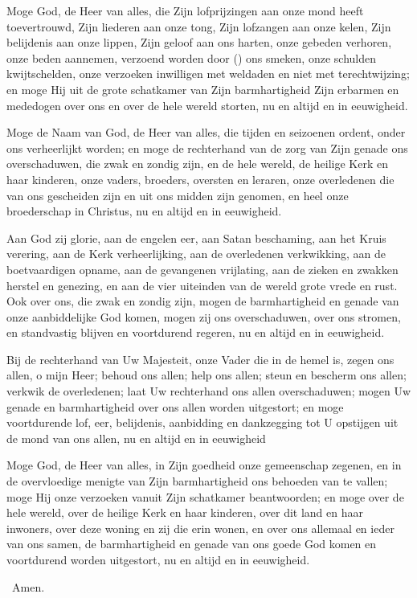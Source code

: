 \documentclass[12pt,twoside,a5paper]{article}
\begin{document}
\begin{halfparskip}
   Moge God, de Heer van alles, die Zijn lofprijzingen aan onze mond heeft toevertrouwd, Zijn liederen aan onze tong, Zijn lofzangen aan onze kelen, Zijn belijdenis aan onze lippen, Zijn geloof aan ons harten, onze gebeden verhoren, onze beden aannemen, verzoend worden door () ons smeken, onze schulden kwijtschelden, onze verzoeken inwilligen met weldaden en niet met terechtwijzing; en moge Hij uit de grote schatkamer van Zijn barmhartigheid Zijn erbarmen en mededogen over ons en over de hele wereld storten, nu en altijd en in eeuwigheid.

   Moge de Naam van God, de Heer van alles, die tijden en seizoenen ordent, onder ons verheerlijkt worden; en moge de rechterhand van de zorg van Zijn genade ons overschaduwen, die zwak en zondig zijn, en de hele wereld, de heilige Kerk en haar kinderen, onze vaders, broeders, oversten en leraren, onze overledenen die van ons gescheiden zijn en uit ons midden zijn genomen, en heel onze broederschap in Christus, nu en altijd en in eeuwigheid.

   Aan God zij glorie, aan de engelen eer, aan Satan beschaming, aan het Kruis verering, aan de Kerk verheerlijking, aan de overledenen verkwikking, aan de boetvaardigen opname, aan de gevangenen vrijlating, aan de zieken en zwakken herstel en genezing, en aan de vier uiteinden van de wereld grote vrede en rust. Ook over ons, die zwak en zondig zijn, mogen de barmhartigheid en genade van onze aanbiddelijke God komen, mogen zij ons overschaduwen, over ons stromen, en standvastig blijven en voortdurend regeren, nu en altijd en in eeuwigheid.

   Bij de rechterhand van Uw Majesteit, onze Vader die in de hemel is, zegen ons allen, o mijn Heer; behoud ons allen; help ons allen; steun en bescherm ons allen; verkwik de overledenen; laat Uw rechterhand ons allen overschaduwen; mogen Uw genade en barmhartigheid over ons allen worden uitgestort; en moge voortdurende lof, eer, belijdenis, aanbidding en dankzegging tot U opstijgen uit de mond van ons allen, nu en altijd en in eeuwigheid

    Moge God, de Heer van alles, in Zijn goedheid onze gemeenschap zegenen, en in de overvloedige menigte van Zijn barmhartigheid ons behoeden van te vallen; moge Hij onze verzoeken vanuit Zijn schatkamer beantwoorden; en moge over de hele wereld, over de heilige Kerk en haar kinderen, over dit land en haar inwoners, over deze woning en zij die erin wonen, en over ons allemaal en ieder van ons samen, de barmhartigheid en genade van ons goede God komen en voortdurend worden uitgestort, nu en altijd en in eeuwigheid.

  \rr~Amen.
\end{halfparskip}

\end{document}
